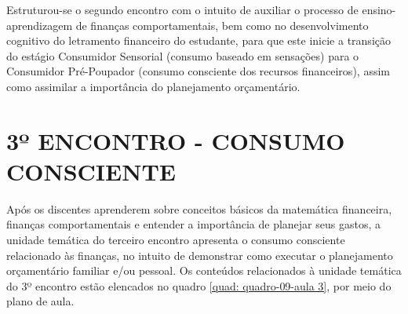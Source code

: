 Estruturou-se o segundo encontro com o intuito de auxiliar o processo de ensino-aprendizagem de finanças comportamentais, bem como no desenvolvimento cognitivo do letramento financeiro do estudante, para que este inicie a transição do estágio Consumidor Sensorial (consumo baseado em sensações) para o Consumidor Pré-Poupador (consumo consciente dos recursos financeiros), assim como assimilar a importância do planejamento orçamentário.

\section{3º ENCONTRO - CONSUMO CONSCIENTE}
Após os discentes aprenderem sobre conceitos básicos da matemática financeira, finanças comportamentais e entender a importância de planejar seus gastos, a unidade temática do terceiro encontro apresenta o consumo consciente relacionado às finanças, no intuito de demonstrar como executar o planejamento orçamentário familiar e/ou pessoal. Os conteúdos relacionados à unidade temática do 3º encontro estão elencados no quadro \ref{quad: quadro-09-aula 3}, por meio do plano de aula.

